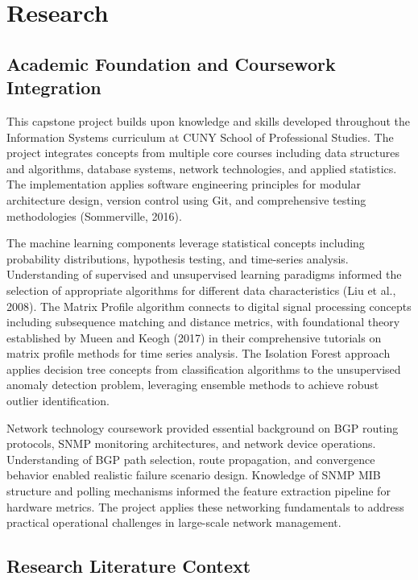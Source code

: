 \documentclass[11pt]{article}
\begin{document}
\section{Research}

\subsection{Academic Foundation and Coursework Integration}

This capstone project builds upon knowledge and skills developed throughout the Information Systems curriculum at CUNY School of Professional Studies. The project integrates concepts from multiple core courses including data structures and algorithms, database systems, network technologies, and applied statistics. The implementation applies software engineering principles for modular architecture design, version control using Git, and comprehensive testing methodologies (Sommerville, 2016).

The machine learning components leverage statistical concepts including probability distributions, hypothesis testing, and time-series analysis. Understanding of supervised and unsupervised learning paradigms informed the selection of appropriate algorithms for different data characteristics (Liu et al., 2008). The Matrix Profile algorithm connects to digital signal processing concepts including subsequence matching and distance metrics, with foundational theory established by Mueen and Keogh (2017) in their comprehensive tutorials on matrix profile methods for time series analysis. The Isolation Forest approach applies decision tree concepts from classification algorithms to the unsupervised anomaly detection problem, leveraging ensemble methods to achieve robust outlier identification.

Network technology coursework provided essential background on BGP routing protocols, SNMP monitoring architectures, and network device operations. Understanding of BGP path selection, route propagation, and convergence behavior enabled realistic failure scenario design. Knowledge of SNMP MIB structure and polling mechanisms informed the feature extraction pipeline for hardware metrics. The project applies these networking fundamentals to address practical operational challenges in large-scale network management.

\subsection{Research Literature Context}
\end{document}
